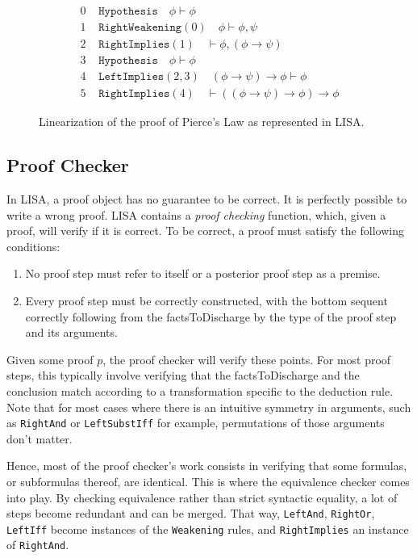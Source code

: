 \begin{figure}

\begin{equation}
\begin{split}
0 &\texttt { Hypothesis} \quad \phi \vdash \phi\\
1 &\texttt { RightWeakening}(0) \quad  \phi \vdash \phi, \psi\\
2 &\texttt { RightImplies}(1) \quad  \vdash \phi, (\phi \to \psi)\\
3 &\texttt { Hypothesis} \quad \phi \vdash \phi\\
4 &\texttt { LeftImplies}(2,3) \quad (\phi \to \psi) \to \phi \vdash \phi\\
5 &\texttt { RightImplies}(4) \quad \vdash ((\phi \to \psi) \to \phi) \to \phi
\end{split}
\end{equation}
    \caption{Linearization of the proof of Pierce's Law as represented in LISA.}
    \label{fig:exampleProofLinear}
\end{figure}

\subsection{Proof Checker}
\label{subs:proofchecker}

In LISA, a proof object has no guarantee to be correct. It is perfectly possible to write a wrong proof. LISA contains a \textit{proof checking} function, which, given a proof, will verify if it is correct. To be correct, a proof must satisfy the following conditions:
\begin{enumerate}
    \item No proof step must refer to itself or a posterior proof step as a premise.
    \item Every proof step must be correctly constructed, with the bottom sequent correctly following from the factsToDischarge by the type of the proof step and its arguments.
\end{enumerate}


Given some proof $p$, the proof checker will verify these points. For most proof steps, this typically involve verifying that the factsToDischarge and the conclusion match according to a transformation specific to the deduction rule. Note that for most cases where there is an intuitive symmetry in arguments, such as \texttt{RightAnd} or \texttt{LeftSubstIff} for example, permutations of those arguments don't matter.

Hence, most of the proof checker's work consists in verifying that some formulas, or subformulas thereof, are identical. This is where the equivalence checker comes into play. By checking equivalence rather than strict syntactic equality, a lot of steps become redundant and can be merged. That way, \texttt{LeftAnd}, \texttt{RightOr}, \texttt{LeftIff} become instances of the \texttt{Weakening} rules, and \texttt{RightImplies} an instance of \texttt{RightAnd}. 

